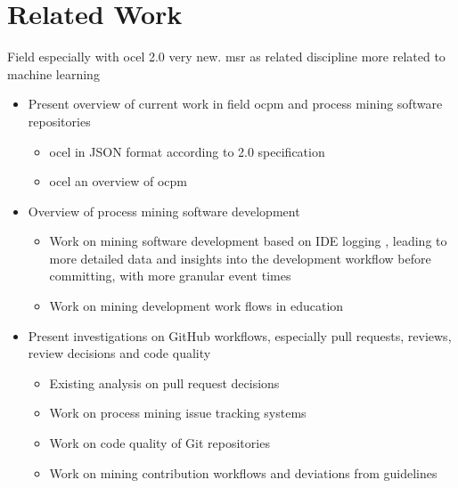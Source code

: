 \chapter{Related Work}
\label{chap:related_work}

Field especially with \ac{ocel} 2.0 very new. \ac{msr} as related discipline more related to machine learning %

\begin{itemize}
	\item Present overview of current work in field \ac{ocpm} and process mining software repositories
	\begin{itemize}
		\item \ac{ocel} in JSON format according to 2.0 specification \autocite{DBLP:journals/corr/abs-2403-01975}
		\item \ac{ocel} an overview of \ac{ocpm} \autocite{DBLP:conf/ictac/Aalst21a}
	\end{itemize}
	\item Overview of process mining software development
	\begin{itemize}
		\item Work on mining software development based on IDE logging \autocite{DBLP:conf/ispw/ArdimentoBCM19, DBLP:conf/iccsa/ChaturvediSS13}, leading to more detailed data and insights into the development workflow before committing, with more granular event times
		\item Work on mining development work flows in education \autocite{DBLP:conf/edm/DumbachAZE20, DBLP:journals/eait/MacakKCB21}
	\end{itemize}
	\item Present investigations on GitHub workflows, especially pull requests, reviews, review decisions and code quality
	\begin{itemize}
		\item Existing analysis on pull request decisions \autocite{DBLP:journals/tse/ZhangYGR23, DBLP:conf/icncc/PooputM18}
		\item Work on process mining issue tracking systems \autocite{DBLP:conf/icsm/CoremansKRKFC23}
		\item Work on code quality of Git repositories \autocite{DBLP:journals/corr/abs-2203-04374, Scholar:apostolidis2023evaluation}
		\item Work on mining contribution workflows and deviations from guidelines \autocite{DBLP:conf/icsm/ElazharySEZ19, DBLP:conf/icse/Liu0MKYXGG24}
	\end{itemize}
\end{itemize}


